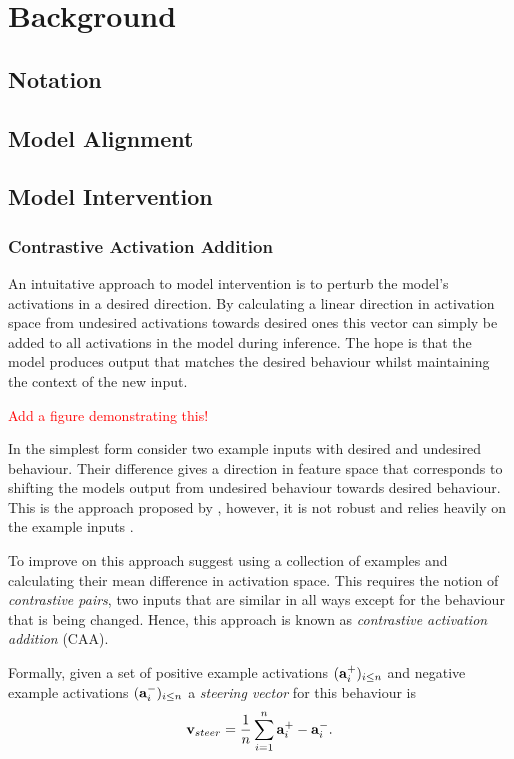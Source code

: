 \chapter{Background}

\section{Notation}

\section{Model Alignment}

\section{Model Intervention}

\subsection{Contrastive Activation Addition}
\label{caa}

An intuitative approach to model intervention is to perturb the model's activations in a desired direction.
By calculating a linear direction in activation space from undesired activations towards desired ones this vector can simply be added to all activations in the model during inference.
The hope is that the model produces output that matches the desired behaviour whilst maintaining the context of the new input.

\textcolor{red}{Add a figure demonstrating this!}

In the simplest form consider two example inputs with desired and undesired behaviour.
Their difference gives a direction in feature space that corresponds to shifting the models output from undesired behaviour towards desired behaviour.
This is the approach proposed by \citet{activation-addition}, however, it is not robust and relies heavily on the example inputs \cite{caa}.

To improve on this approach \citet{caa} suggest using a collection of examples and calculating their mean difference in activation space.
This requires the notion of \textit{contrastive pairs}, two inputs that are similar in all ways except for the behaviour that is being changed.
Hence, this approach is known as \textit{contrastive activation addition} (CAA).

Formally, given a set of positive example activations $(\mathbf{a}_i^+)_{i\le n}$ and negative example activations $(\mathbf{a}_i^-)_{i\le n}$ a \textit{steering vector} for this behaviour is
\[\mathbf{v}_{steer} = \frac{1}{n}\sum_{i=1}^{n}\mathbf{a}_i^+ - \mathbf{a}_i^-.\]

